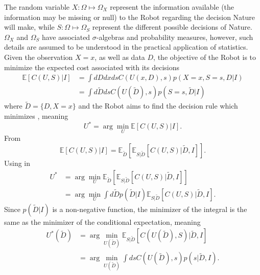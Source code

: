 The random variable $X: \Omega \mapsto \Omega_X$ represent the information available (the information may be missing or null) to the Robot regarding the decision Nature will make, while $S: \Omega \mapsto \Omega_S$ represent the different possible decisions of Nature. $\Omega_X$ and $\Omega_S$ have associated $\sigma$-algebras and probability measures, however, such details are assumed to be understood in the practical application of statistics. Given the observation $X=x$, as well as data $D$, the objective of the Robot is to minimize the expected cost associated with its decisions~\cite{murphy2023probabilistic}
\begin{equation}
	\begin{split}
		\mathbb{E}[C(U, S)|I] &= \int dD dx ds  C(U(x,D),s) p(X=x,S=s,D|I)\\
		& = \int d\tilde{D} ds  C(U(\tilde{D}),s) p(S=s,\tilde{D}|I)
	\end{split}
	\label{eq:conditional_expected_cost}
\end{equation}
where $\tilde{D} = \{D,X= x\}$ and the Robot aims to find the decision rule which minimizes , meaning
\begin{equation}
	U^* = \arg\min_{U} \mathbb{E}[C(U, S)|I].
	\label{eq:decision_rule_x}
\end{equation}	
From 
\begin{equation}
	\mathbb{E}[C(U, S)|I] = \mathbb{E}_{\tilde{D}}[\mathbb{E}_{S|\tilde{D}}[C(U, S)|\tilde{D},I]].
	\label{eq:total2}
\end{equation}
Using  in 
\begin{equation}
	\begin{split}
		U^* &= \arg\min_{U} \mathbb{E}_{\tilde{D}}[\mathbb{E}_{S|\tilde{D}}[C(U, S)|\tilde{D},I]]\\
		&= \arg\min_{U} \int d\tilde{D}p(\tilde{D}|I) \mathbb{E}_{S|\tilde{D}}[C(U, S)|\tilde{D},I].
	\end{split}
	\label{eq:decision_rule2}
\end{equation}
Since $p(\tilde{D}|I)$ is a non-negative function, the minimizer of the integral is the same as the minimizer of the conditional expectation, meaning
\begin{equation}
	\begin{split}
		U^*(\tilde{D}) &= \arg\min_{U(\tilde{D})} \mathbb{E}_{S|\tilde{D}}[C(U(\tilde{D}), S)|\tilde{D},I]\\
		& = \arg\min_{U(\tilde{D})}\int  ds C(U(\tilde{D}),s) p(s|\tilde{D},I).
	\end{split}
	\label{eq:decision_rule3}
\end{equation}
